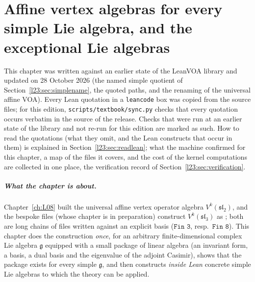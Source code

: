 \chapter[Affine VOAs for every simple Lie algebra; the exceptional Lie algebras]{Affine vertex algebras for every simple Lie algebra, and the exceptional Lie algebras}\label{ch:L23}
\begingroup\setlength{\emergencystretch}{3em}\sloppy

\providecommand{\lxxiiig}{\mathfrak g}
\providecommand{\lxxiiivac}{|0\rangle}
\providecommand{\lxxiiiV}{V^k(\mathfrak g)}
\providecommand{\lxxiiiL}{L_k(\mathfrak g)}
\providecommand{\lxxiiihv}{h^\vee}
\providecommand{\lxxiiiad}{\operatorname{ad}}
\providecommand{\lxxiiiKil}{\operatorname{Kil}}
\providecommand{\lxxiiiCas}{C}

This chapter was written against an earlier state of the LeanVOA library and updated on 28 October 2026 (the named simple
quotient of Section~\ref{l23:sec:simplename}, the quoted paths, and the renaming of the universal affine VOA). Every Lean
quotation in a \texttt{leancode} box was copied from the source files; for this edition, \texttt{scripts/textbook/sync.py} checks
that every quotation occurs verbatim in the source of the release. Checks that were run at an earlier state of the library and
not re-run for this edition are marked as such. How to read the quotations (what they omit, and the Lean
constructs that occur in them) is explained in Section~\ref{l23:sec:readlean}; what the machine confirmed for this
chapter, a map of the files it covers, and the cost of the kernel computations are collected in one place, the
verification record of Section~\ref{l23:sec:verification}.

\paragraph{What the chapter is about.}
Chapter~\ref{ch:L08} built the universal affine vertex operator algebra $V^k(\mathfrak{sl}_2)$, and the bespoke files
 (whose chapter is in preparation) construct $V^k(\mathfrak{sl}_3)$ as ; both are
long chains of files written against an explicit basis ($\texttt{Fin 3}$, resp.\ $\texttt{Fin 8}$). This chapter does the construction \emph{once}, for an
arbitrary finite-dimensional complex Lie algebra $\lxxiiig$ equipped with a small package of linear algebra (an
invariant form, a basis, a dual basis and the eigenvalue of the adjoint Casimir), shows that the package exists for
every simple $\lxxiiig$, and then constructs \emph{inside Lean} concrete simple Lie algebras to which the theory can be
applied.

